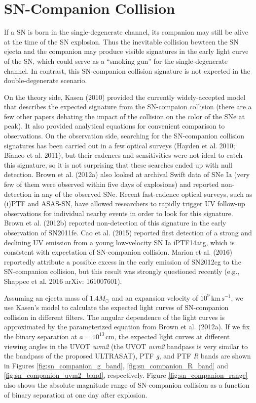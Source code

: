 \documentclass[11pt]{article}
\begin{document}
\section{SN-Companion Collision}
\label{sec:sn_companion_collision}

If a SN is born in the single-degenerate channel, its companion may
still be alive at the time of the SN explosion. Thus the inevitable
collision bewteen the SN ejecta and the companion may produce visible
signatures in the early light curve of the SN, which could serve as a
``smoking gun'' for the single-degenerate channel. In contrast, this
SN-companion collision signature is not expected in the
double-degenerate scenario.

On the theory side, Kasen (2010) provided the currently
widely-accepted model that describes the expected signature from the
SN-compaion collision (there are a few other papers debating the
impact of the collision on the color of the SNe at peak). It also
provided analytical equations for convenient comparison to
observations. On the observation side, searching for the SN-companion
collision signatures has been carried out in a few optical surveys
(Hayden et al. 2010; Bianco et al. 2011), but their cadences and
sensitivities were not ideal to catch this signature, so it is not
surprising that these searches ended up with null detection. Brown et
al. (2012a) also looked at archival Swift data of SNe Ia (very few of
them were observed within five days of explosions) and reported
non-detection in any of the observed SNe. Recent fast-cadence optical
surveys, such as (i)PTF and ASAS-SN, have allowed researchers to
rapidly trigger UV follow-up observations for individual nearby events
in order to look for this signature. Brown et al. (2012b) reported
non-detection of this signature in the early observation of
SN2011fe. Cao et al. (2015) reported first detection of a strong and
declining UV emission from a young low-velocity SN Ia iPTF14atg, which
is consistent with expectation of SN-companion collision.  Marion et
al. (2016) reportedly attribute a possible excess in the early
emission of SN2012cg to the SN-companion collision, but this result
was strongly questioned recently (e.g., Shappee et al. 2016 arXiv:
161007601).

Assuming an ejecta mass of $1.4M_\odot$ and an expansion velocity of
$10^9\,\textrm{km}\,\textrm{s}^{-1}$, we use Kasen's model to
calculate the expected light curves of SN-companion collision in
different filters. The angular dependence of the light curves is
approximated by the parameterized equation from Brown et al. (2012a).
If we fix the binary separation at $a=10^{13}\,\textrm{cm}$, the
expected light curves at different viewing angles in the UVOT
\textit{uvm2} (the UVOT \textit{uvm2} bandpass is very similar to the
bandpass of the proposed ULTRASAT), PTF \textit{g}, and PTF \textit{R}
bands are shown in Figures \ref{fig:sn_companion_g_band},
\ref{fig:sn_companion_R_band} and \ref{fig:sn_companion_uvm2_band},
respectively. Figure \ref{fig:sn_companion_range} also shows the
absolute magnitude range of SN-companion collision as a function of
binary separation at one day after explosion.
\end{document}
